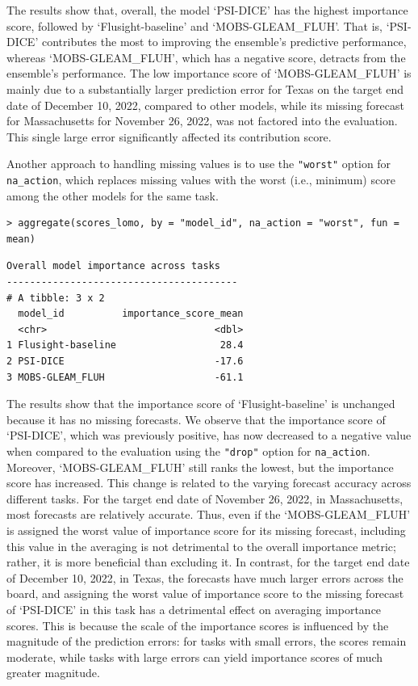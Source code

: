 \documentclass[
  article,
  shortnames,
  notitle]{jss}
\begin{document}
\vspace{0.35cm} 
\normalsize

The results show that, overall, the model `PSI-DICE' has the highest
importance score, followed by `Flusight-baseline' and
`MOBS-GLEAM\_FLUH'. That is, `PSI-DICE' contributes the most to
improving the ensemble's predictive performance, whereas
`MOBS-GLEAM\_FLUH', which has a negative score, detracts from the
ensemble's performance. The low importance score of `MOBS-GLEAM\_FLUH'
is mainly due to a substantially larger prediction error for Texas on
the target end date of December 10, 2022, compared to other models,
while its missing forecast for Massachusetts for November 26, 2022, was
not factored into the evaluation. This single large error significantly
affected its contribution score.

Another approach to handling missing values is to use the
\texttt{"worst"} option for \texttt{na\_action}, which replaces missing
values with the worst (i.e., minimum) score among the other models for
the same task.

\begin{verbatim}
> aggregate(scores_lomo, by = "model_id", na_action = "worst", fun = mean) 
\end{verbatim}

\small

\begin{verbatim}
Overall model importance across tasks
---------------------------------------- 
# A tibble: 3 x 2
  model_id          importance_score_mean
  <chr>                             <dbl>
1 Flusight-baseline                  28.4
2 PSI-DICE                          -17.6
3 MOBS-GLEAM_FLUH                   -61.1
\end{verbatim}

\vspace{0.35cm} 
\normalsize

The results show that the importance score of `Flusight-baseline' is
unchanged because it has no missing forecasts. We observe that the
importance score of `PSI-DICE', which was previously positive, has now
decreased to a negative value when compared to the evaluation using the
\texttt{"drop"} option for \texttt{na\_action}. Moreover,
`MOBS-GLEAM\_FLUH' still ranks the lowest, but the importance score has
increased. This change is related to the varying forecast accuracy
across different tasks. For the target end date of November 26, 2022, in
Massachusetts, most forecasts are relatively accurate. Thus, even if the
`MOBS-GLEAM\_FLUH' is assigned the worst value of importance score for
its missing forecast, including this value in the averaging is not
detrimental to the overall importance metric; rather, it is more
beneficial than excluding it. In contrast, for the target end date of
December 10, 2022, in Texas, the forecasts have much larger errors
across the board, and assigning the worst value of importance score to
the missing forecast of `PSI-DICE' in this task has a detrimental effect
on averaging importance scores. This is because the scale of the
importance scores is influenced by the magnitude of the prediction
errors: for tasks with small errors, the scores remain moderate, while
tasks with large errors can yield importance scores of much greater
magnitude.
\end{document}
